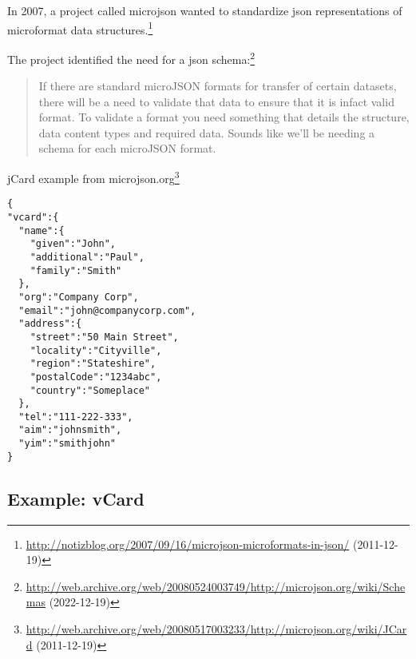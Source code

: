\documentclass[12pt,a4paper]{scrartcl}		%
\newcommand{\citeurl}[2]{\url{#1} (#2)}
\begin{document}


In 2007, a project called microjson wanted to standardize json representations of microformat data structures.\footnote{\citeurl{http://notizblog.org/2007/09/16/microjson-microformats-in-json/}{2011-12-19}} 

The project identified the need for a json schema:\footnote{\citeurl{http://web.archive.org/web/20080524003749/http://microjson.org/wiki/Schemas}{2022-12-19}}
\begin{quote}
  If there are standard microJSON formats for transfer of certain datasets, there will be a need to validate that data to ensure that it is infact valid format. To validate a format you need something that details the structure, data content types and required data. Sounds like we'll be needing a schema for each microJSON format. 
\end{quote}


jCard example from microjson.org\footnote{\citeurl{http://web.archive.org/web/20080517003233/http://microjson.org/wiki/JCard}{2011-12-19}}
\begin{lstlisting}
{
"vcard":{
  "name":{
    "given":"John",
    "additional":"Paul",
    "family":"Smith"
  },
  "org":"Company Corp",
  "email":"john@companycorp.com",
  "address":{
    "street":"50 Main Street",
    "locality":"Cityville",
    "region":"Stateshire",
    "postalCode":"1234abc",
    "country":"Someplace"
  },
  "tel":"111-222-333",
  "aim":"johnsmith",
  "yim":"smithjohn"
}
\end{lstlisting}

\subsection{Example: vCard}
\end{document}
